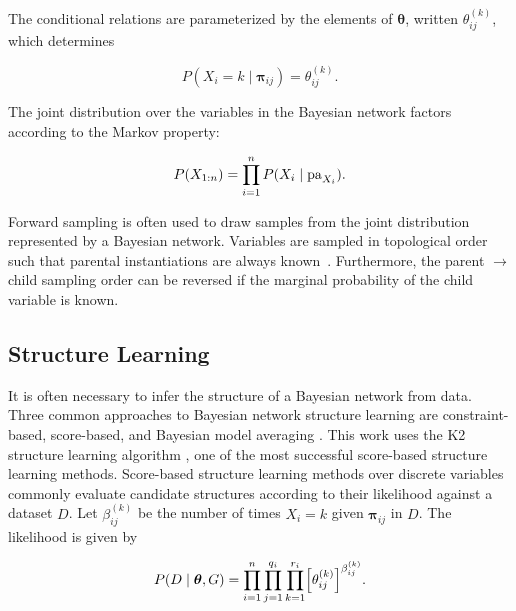 The conditional relations are parameterized by the elements of $\bm{\theta}$, written $\theta_{ij}^{(k)}$, which determines

\begin{equation}
P(X_i = k \mid \bm{\pi}_{ij}) = \theta_{ij}^{(k)}\text{.}
\end{equation}

The joint distribution over the variables in the Bayesian network factors according to the Markov property:

\begin{equation}
P(X_{1:n}) = \prod_{i=1}^n P(X_i \mid \operatorname{pa}_{X_i})\text{.}
\end{equation}

Forward sampling is often used to draw samples from the joint distribution represented by a Bayesian network.
Variables are sampled in topological order such that parental instantiations are always known~\citep{algo_2009}.
Furthermore, the parent $\rightarrow$ child sampling order can be reversed if the marginal probability of the child variable is known.


\subsection{Structure Learning}

It is often necessary to infer the structure of a Bayesian network from data.
Three common approaches to Bayesian network structure learning are constraint-based, score-based, and Bayesian model averaging \citep[see][chap.~18]{PGM_2009}.
This work uses the K2 structure learning algorithm \citep{K2}, one of the most successful score-based structure learning methods.
Score-based structure learning methods over discrete variables commonly evaluate candidate structures according to their likelihood against a dataset $D$.
Let $\beta_{ij}^{(k)}$ be the number of times $X_i = k$ given $\bm{\pi}_{ij}$ in $D$.
The likelihood is given by

\begin{equation}
P(D\mid \bm{\theta}, G) = \prod_{i=1}^n \prod_{j=1}^{q_i} \prod_{k=1}^{r_i} \brock{\theta_{ij}^{(k)}}^{\beta_{ij}^{(k)}}\text{.}
\end{equation}


